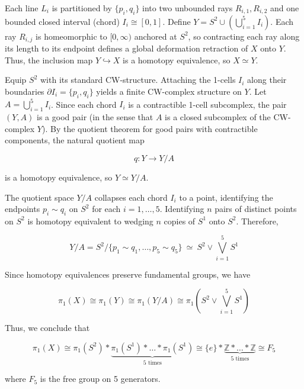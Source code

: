 \documentclass{article}
\begin{document}
	Each line $L_i$ is partitioned by $\{p_i, q_i\}$ into two unbounded rays $R_{i,1}, R_{i,2}$ and one bounded closed interval (chord) $I_i \cong [0, 1]$. Define $Y = S^2 \cup \left(\bigcup_{i=1}^5 I_i\right)$. Each ray $R_{i,j}$ is homeomorphic to $[0, \infty)$ anchored at $S^2$, so contracting each ray along its length to its endpoint defines a global deformation retraction of $X$ onto $Y$. Thus, the inclusion map $Y \hookrightarrow X$ is a homotopy equivalence, so $X \simeq Y$.
	
	Equip $S^2$ with its standard CW-structure. Attaching the 1-cells $I_i$ along their boundaries $\partial I_i = \{p_i, q_i\}$ yields a finite CW-complex structure on $Y$. Let $A = \bigcup_{i=1}^5 I_i$. Since each chord $I_i$ is a contractible 1-cell subcomplex, the pair $(Y, A)$ is a good pair (in the sense that $A$ is a closed subcomplex of the CW-complex $Y$). By the quotient theorem for good pairs with contractible components, the natural quotient map
	
	$$q: Y \longrightarrow Y / A$$
	
	is a homotopy equivalence, so $Y \simeq Y / A$.
	
	The quotient space $Y / A$ collapses each chord $I_i$ to a point, identifying the endpoints $p_i \sim q_i$ on $S^2$ for each $i = 1, \dots, 5$. Identifying $n$ pairs of distinct points on $S^2$ is homotopy equivalent to wedging $n$ copies of $S^1$ onto $S^2$. Therefore,
	
	$$Y / A = S^2 / \{p_1 \sim q_1, \dots, p_5 \sim q_5\} \ \simeq \ S^2 \vee \bigvee_{i=1}^5 S^1$$
	
	Since homotopy equivalences preserve fundamental groups, we have
	
	$$\pi_1(X) \cong \pi_1(Y) \cong \pi_1(Y / A) \cong \pi_1\left(S^2 \vee \bigvee_{i=1}^5 S^1\right)$$
	
	Thus, we conclude that
	
	$$\pi_1(X) \cong \pi_1(S^2) * \underbrace{\pi_1(S^1) * \dots * \pi_1(S^1)}_{5 \text{ times}} \cong \{e\} * \underbrace{\mathbb{Z} * \dots * \mathbb{Z}}_{5 \text{ times}} \cong F_5$$
	
	where $F_5$ is the free group on 5 generators.
	
\end{document}
